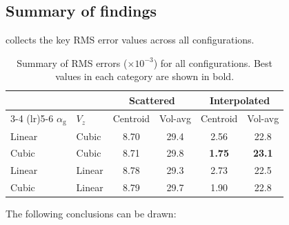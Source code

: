 \documentclass[11pt,a4paper]{article}
\newcommand{\alphag}{\alpha_{\mathrm{g}}}
\newcommand{\Vz}{V_z}
\begin{document}
\subsection{Summary of findings}
\label{sec:summary_findings}

 collects the key RMS error values across all
configurations.

\begin{table}[ht]
\centering
\caption{Summary of RMS errors ($\times 10^{-3}$) for all configurations.
  Best values in each category are shown in bold.}
\label{tab:summary}
\setlength{\tabcolsep}{5pt}
\begin{tabular}{ll cccc}
  \toprule
  & & \multicolumn{2}{c}{\textbf{Scattered}} &
      \multicolumn{2}{c}{\textbf{Interpolated}} \\
  \cmidrule(lr){3-4} \cmidrule(lr){5-6}
  $\alphag$ & $\Vz$ & Centroid & Vol-avg & Centroid & Vol-avg \\
  \midrule
  Linear & Cubic  & 8.70 & 29.4 & 2.56 & 22.8 \\
  Cubic  & Cubic  & 8.71 & 29.8 & \textbf{1.75} & \textbf{23.1} \\
  Linear & Linear & 8.78 & 29.3 & 2.73 & 22.5 \\
  Cubic  & Linear & 8.79 & 29.7 & 1.90 & 22.8 \\
  \bottomrule
\end{tabular}
\end{table}

The following conclusions can be drawn:
\end{document}
